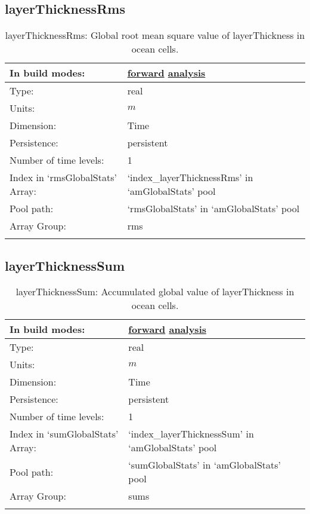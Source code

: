 \subsection[layerThicknessRms]{layerThicknessRms}
\label{subsec:var_sec_amGlobalStats_layerThicknessRms}
\begin{center}
\begin{longtable}{| p{2.0in} | p{4.0in} |}
        \hline 
        In build modes: & \hyperref[subsec:forward_var_tab_amGlobalStats]{forward} \hyperref[subsec:analysis_var_tab_amGlobalStats]{analysis} \\
        \hline 
        Type: & real \\
        \hline 
        Units: & $m$ \\
        \hline 
        Dimension: & Time \\
        \hline 
        Persistence: & persistent \\
        \hline 
        Number of time levels: & 1 \\
        \hline 
		 Index in `rmsGlobalStats' Array: & `index\_layerThicknessRms' in `amGlobalStats' pool \\
		 \hline 
            Pool path: & `rmsGlobalStats' in `amGlobalStats' pool \\
		 \hline 
		 Array Group: & rms \\
		 \hline 
    \caption{layerThicknessRms: Global root mean square value of layerThickness in ocean cells.}
\end{longtable}
\end{center}
\subsection[layerThicknessSum]{layerThicknessSum}
\label{subsec:var_sec_amGlobalStats_layerThicknessSum}
\begin{center}
\begin{longtable}{| p{2.0in} | p{4.0in} |}
        \hline 
        In build modes: & \hyperref[subsec:forward_var_tab_amGlobalStats]{forward} \hyperref[subsec:analysis_var_tab_amGlobalStats]{analysis} \\
        \hline 
        Type: & real \\
        \hline 
        Units: & $m$ \\
        \hline 
        Dimension: & Time \\
        \hline 
        Persistence: & persistent \\
        \hline 
        Number of time levels: & 1 \\
        \hline 
		 Index in `sumGlobalStats' Array: & `index\_layerThicknessSum' in `amGlobalStats' pool \\
		 \hline 
            Pool path: & `sumGlobalStats' in `amGlobalStats' pool \\
		 \hline 
		 Array Group: & sums \\
		 \hline 
    \caption{layerThicknessSum: Accumulated global value of layerThickness in ocean cells.}
\end{longtable}
\end{center}
